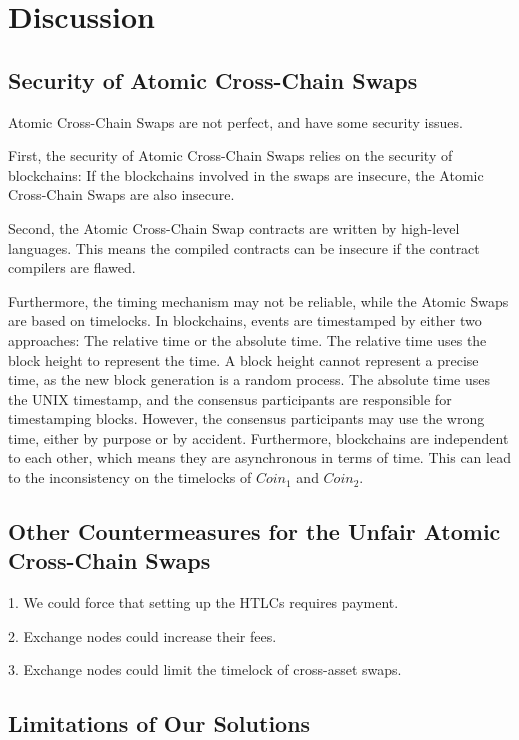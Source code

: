 \section{Discussion}
\label{sec:discussion}

\subsection{Security of Atomic Cross-Chain Swaps}

Atomic Cross-Chain Swaps are not perfect, and have some security issues.

First, the security of Atomic Cross-Chain Swaps relies on the security of blockchains:
If the blockchains involved in the swaps are insecure, the Atomic Cross-Chain Swaps are also insecure.

Second, the Atomic Cross-Chain Swap contracts are written by high-level languages.
This means the compiled contracts can be insecure if the contract compilers are flawed.

Furthermore, the timing mechanism may not be reliable, while the Atomic Swaps are based on timelocks.
In blockchains, events are timestamped by either two approaches: The relative time or the absolute time.
The relative time uses the block height to represent the time.
A block height cannot represent a precise time, as the new block generation is a random process.
The absolute time uses the UNIX timestamp, and the consensus participants are responsible for timestamping blocks.
However, the consensus participants may use the wrong time, either by purpose or by accident.
Furthermore, blockchains are independent to each other, which means they are asynchronous in terms of time.
This can lead to the inconsistency on the timelocks of $Coin_1$ and $Coin_2$.


\subsection{Other Countermeasures for the Unfair Atomic Cross-Chain Swaps}

1.  We could force that setting up the HTLCs requires payment.

2.  Exchange nodes could increase their fees.

3.  Exchange nodes could limit the timelock of cross-asset swaps.


\subsection{Limitations of Our Solutions}



